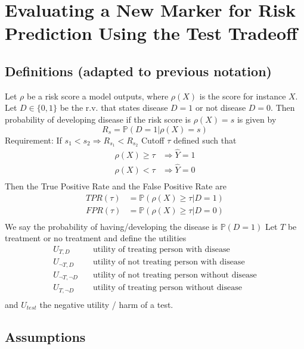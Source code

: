 
\section{Evaluating a New Marker for Risk Prediction Using the Test Tradeoff}

\subsection{Definitions (adapted to previous notation)}
	Let $\rho$ be a risk score a model outputs, where $\rho(X)$ is the score for instance $X$.
	Let $D\in \{0,1\}$ be the r.v. that states disease $D=1$ or not disease $D=0$.
	Then probability of developing disease if the risk score is $\rho(X)=s$ is given by
	\[
		R_s = \mathbb{P}(D=1 | \rho(X) = s)
	\]
	Requirement: If $s_1 < s_2 \Rightarrow R_{s_1} < R_{s_2}$
	Cutoff $\tau$ defined such that 
	\[
	\begin{aligned}
    		\rho(X) \geq \tau &\Rightarrow \hat{Y} = 1 \\
    		\rho(X) < \tau &\Rightarrow \hat{Y} = 0 \\
    	\end{aligned}
	\]
	Then the True Positive Rate and the False Positive Rate are
	\[
	\begin{aligned}
    		TPR(\tau) &= \mathbb{P}(\rho(X) \geq \tau | D = 1) \\
    		FPR(\tau) &= \mathbb{P}(\rho(X) \geq \tau | D = 0) \\
    	\end{aligned}
	\]
	We say the probability of having/developing the disease is $\mathbb{P}(D=1)$
	Let $T$ be treatment or no treatment and define the utilities
	\[
	\begin{aligned}
    		U_{T, D} 			&\quad \text{utility of treating person with disease}\\
		U_{\neg T, D} 		&\quad \text{utility of not treating person with disease}\\
		U_{\neg T, \neg D} 	&\quad \text{utility of not treating person without disease}\\
		U_{T, \neg D} 		&\quad \text{utility of treating person without disease}\\
    	\end{aligned}
	\]
	and $U_{test}$ the negative utility / harm of a test.
	
\subsection{Assumptions}

